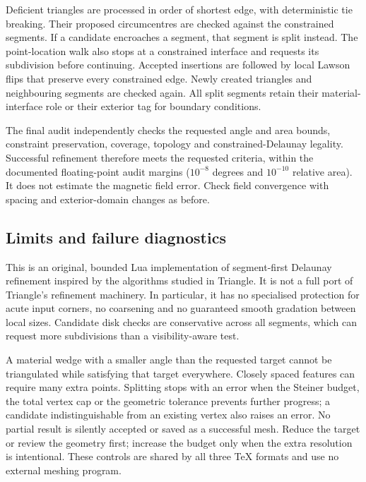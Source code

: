 Deficient triangles are processed in order of shortest edge, with deterministic
tie breaking. Their proposed circumcentres are checked against the constrained
segments. If a candidate encroaches a segment, that segment is split instead.
The point-location walk also stops at a constrained interface and requests
its subdivision before continuing. Accepted insertions are followed by local
Lawson flips that preserve every constrained edge. Newly created triangles
and neighbouring segments are checked again. All split segments retain their
material-interface role or their exterior tag for boundary conditions.

The final audit independently checks the requested angle and area bounds,
constraint preservation, coverage, topology and constrained-Delaunay legality.
Successful refinement therefore meets the requested criteria, within the
documented floating-point audit margins ($10^{-8}$ degrees and $10^{-10}$
relative area). It does not estimate the magnetic field error. Check field
convergence with spacing and exterior-domain changes as before.

\subsection{Limits and failure diagnostics}
This is an original, bounded Lua implementation of segment-first Delaunay
refinement inspired by the algorithms studied in Triangle. It is not a full
port of Triangle's refinement machinery. In particular, it has no specialised
protection for acute input corners, no coarsening and no guaranteed smooth
gradation between local sizes. Candidate disk checks are conservative across
all segments, which can request more subdivisions than a visibility-aware test.

A material wedge with a smaller angle than the requested target cannot be
triangulated while satisfying that target everywhere. Closely spaced features
can require many extra points. Splitting stops with an error when the Steiner
budget, the total vertex cap or the geometric tolerance prevents further
progress; a candidate indistinguishable from an existing vertex also raises
an error. No partial result is silently accepted or saved as a successful mesh.
Reduce the target or review the geometry first; increase the budget only when
the extra resolution is intentional. These controls are shared by all three
TeX formats and use no external meshing program.
